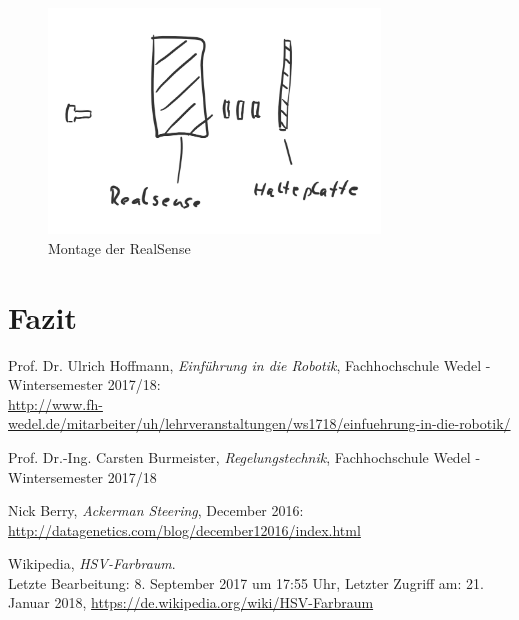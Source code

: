 \documentclass[a4paper,12pt]{report}
\begin{document}
\begin{figure}[ht]
	\centering
	\includegraphics[width=250pt,keepaspectratio]{assets/RealSense-Montage.PNG}
	\caption{Montage der RealSense}
	\label{RealSense-Montage}
\end{figure}


\chapter{Fazit}

\listoftables


\begin{thebibliography}{9}

	Prof. Dr. Ulrich Hoffmann,
	\textit{Einführung in die Robotik},
	Fachhochschule Wedel - Wintersemester 2017/18:\\
	\url{http://www.fh-wedel.de/mitarbeiter/uh/lehrveranstaltungen/ws1718/einfuehrung-in-die-robotik/}

	Prof. Dr.-Ing. Carsten Burmeister,
	\textit{Regelungstechnik},
	Fachhochschule Wedel - Wintersemester 2017/18

	Nick Berry,
	\textit{Ackerman Steering},
	December 2016:\\
	\url{http://datagenetics.com/blog/december12016/index.html}

	Wikipedia,
	\textit{HSV-Farbraum}.\\
	Letzte Bearbeitung: 8. September 2017 um 17:55 Uhr,
	Letzter Zugriff am: 21. Januar 2018,
	\url{https://de.wikipedia.org/wiki/HSV-Farbraum}

\end{thebibliography}
\end{document}
